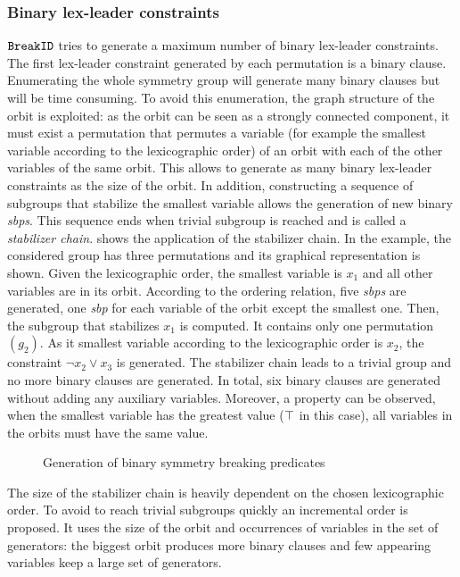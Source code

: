\subsubsection{Binary lex-leader constraints}
$\texttt{BreakID}$ tries to generate a maximum number of binary lex-leader constraints.
The first lex-leader constraint generated by each permutation is a binary clause.
Enumerating the whole symmetry group will generate many binary clauses but will be time consuming.
To avoid this enumeration, the  graph structure  of the orbit is exploited: as the orbit can be seen as a strongly connected component, it must exist a permutation that permutes a variable (for example the smallest variable according to the lexicographic order) of an orbit with each of the other variables of the same orbit. This allows to
generate as many binary lex-leader constraints as the size of the orbit. In addition, constructing 
a sequence of subgroups that stabilize the smallest variable allows the generation of new binary \textit{sbps}.
This sequence ends when trivial subgroup is reached and is called a  \emph{stabilizer chain}.
 shows the application of the stabilizer chain.
In the example, the considered group has three permutations and its graphical representation
is shown. Given the lexicographic order, the smallest variable is $x_1$ and 
all other variables are in its orbit. According to the ordering relation, five 
\textit{sbps} are generated, one \textit{sbp} for each variable of the orbit except the smallest one.
Then, the subgroup that stabilizes $x_1$ is computed. It contains only one permutation $(g_2)$.
As it smallest variable according to the lexicographic order is $x_2$, the constraint $\neg x_2 \lor x_3$ is generated. The stabilizer chain leads to a trivial group and no more binary clauses are generated.
In total, six binary clauses are generated without adding any auxiliary variables.
Moreover, a property can be observed, when the smallest variable has the greatest value 
($\top$ in this case), all variables in the orbits must have the same value.
 \begin{figure}[!htbp]
 
 \caption{Generation of binary symmetry breaking predicates}
 \label{fig:binary_sbp}
\end{figure}
The size of the stabilizer chain is heavily dependent on the chosen lexicographic order.
To avoid to reach trivial subgroups quickly an incremental order is proposed.
It uses the size of the orbit and occurrences of variables in the set of generators:
the biggest orbit produces more binary clauses and few appearing variables keep a large set of generators.

